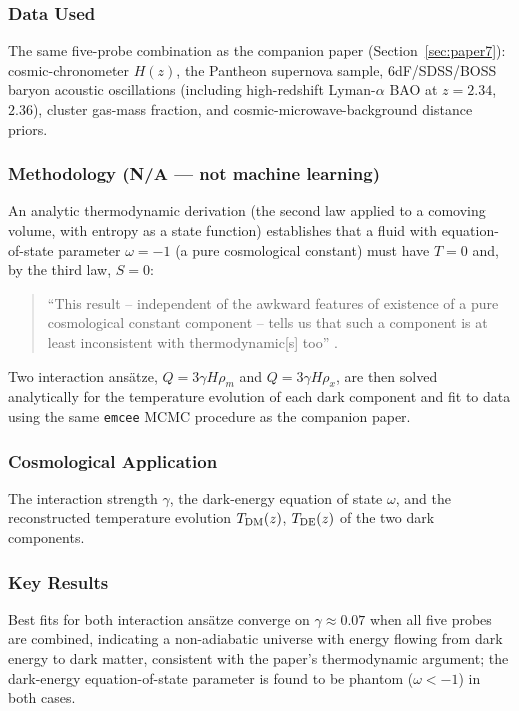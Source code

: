 \documentclass[11pt]{article}
\begin{document}
\subsubsection{Data Used}
The same five-probe combination as the companion paper (Section~\ref{sec:paper7}): cosmic-chronometer $H(z)$, the Pantheon supernova sample, 6dF/SDSS/BOSS baryon acoustic oscillations (including high-redshift Lyman-$\alpha$ BAO at $z=2.34$, $2.36$), cluster gas-mass fraction, and cosmic-microwave-background distance priors.

\subsubsection{Methodology (N/A --- not machine learning)}
An analytic thermodynamic derivation (the second law applied to a comoving volume, with entropy as a state function) establishes that a fluid with equation-of-state parameter $\omega=-1$ (a pure cosmological constant) must have $T=0$ and, by the third law, $S=0$:

\begin{quote}
\enquote{This result -- independent of the awkward features of existence of a pure cosmological constant component -- tells us that such a component is at least inconsistent with thermodynamic[s] too} \citep[p.~4]{cardenas2018thermodynamics}.
\end{quote}

\noindent Two interaction ansätze, $Q=3\gamma H\rho_m$ and $Q=3\gamma H\rho_x$, are then solved analytically for the temperature evolution of each dark component and fit to data using the same \texttt{emcee} MCMC procedure as the companion paper.

\subsubsection{Cosmological Application}
The interaction strength $\gamma$, the dark-energy equation of state $\omega$, and the reconstructed temperature evolution $T_{\rm DM}(z)$, $T_{\rm DE}(z)$ of the two dark components.

\subsubsection{Key Results}
Best fits for both interaction ansätze converge on $\gamma\approx0.07$ when all five probes are combined, indicating a non-adiabatic universe with energy flowing from dark energy to dark matter, consistent with the paper's thermodynamic argument; the dark-energy equation-of-state parameter is found to be phantom ($\omega<-1$) in both cases.
\end{document}
